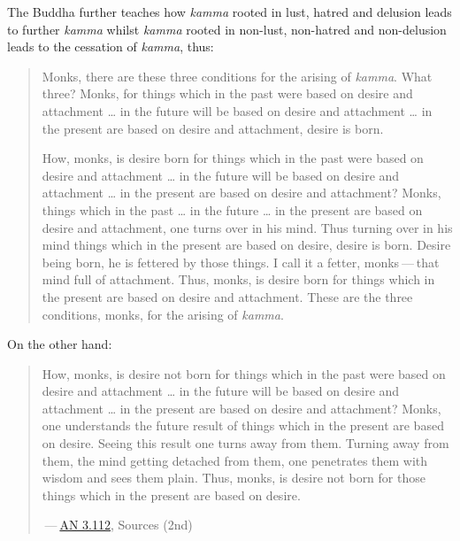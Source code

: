 The Buddha further teaches how \emph{kamma} rooted in lust, hatred and delusion leads to further \emph{kamma} whilst \emph{kamma} rooted in non-lust, non-hatred and non-delusion leads to the cessation of \emph{kamma}, thus:

\begin{quote}
Monks, there are these three conditions for the arising of \emph{kamma}. What three? Monks, for things which in the past were based on desire and attachment \ldots{} in the future will be based on desire and attachment \ldots{} in the present are based on desire and attachment, desire is born.

How, monks, is desire born for things which in the past were based on desire and attachment \ldots{} in the future will be based on desire and attachment \ldots{} in the present are based on desire and attachment? Monks, things which in the past \ldots{} in the future \ldots{} in the present are based on desire and attachment, one turns over in his mind. Thus turning over in his mind things which in the present are based on desire, desire is born. Desire being born, he is fettered by those things. I call it a fetter, monks --- that mind full of attachment. Thus, monks, is desire born for things which in the present are based on desire and attachment. These are the three conditions, monks, for the arising of \emph{kamma}.
\end{quote}

On the other hand:

\begin{quote}
How, monks, is desire not born for things which in the past were based on desire and attachment \ldots{} in the future will be based on desire and attachment \ldots{} in the present are based on desire and attachment? Monks, one understands the future result of things which in the present are based on desire. Seeing this result one turns away from them. Turning away from them, the mind getting detached from them, one penetrates them with wisdom and sees them plain. Thus, monks, is desire not born for those things which in the present are based on desire.

 --- \href{https://suttacentral.net/an3.112/en/sujato}{AN 3.112}, Sources (2nd)
\end{quote}
